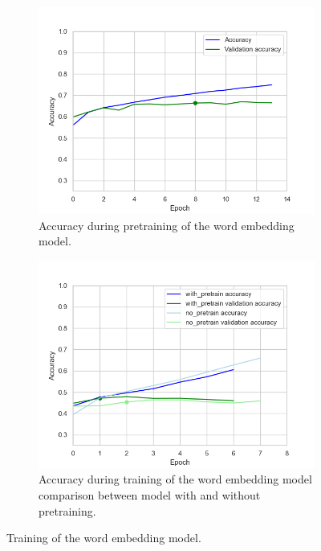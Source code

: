 \documentclass[acmsmall,nonacm]{acmart}
\begin{document}
\begin{figure}[!h]
  \begin{subfigure}[b]{0.45\textwidth}
    \includegraphics[width=\textwidth]{assets/embedded_classifier_accuracy.png}
    \caption{Accuracy during pretraining of the word embedding model.}
    \label{fig:embedding_model_pretrain}
  \end{subfigure}
  \hfill
  \begin{subfigure}[b]{0.45\textwidth}
    \includegraphics[width=\textwidth]{assets/embedded_classifier_comparison_with_pretrain_no_pretrain.png}
    \caption{Accuracy during training of the word embedding model comparison between model with and without pretraining.}
    \label{fig:embedding_model_train}
  \end{subfigure}
  \caption{Training of the word embedding model.}
  \label{fig:embedding_model_training}
\end{figure}
\end{document}

